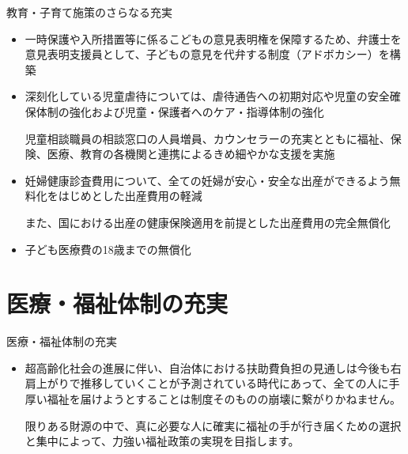 \documentclass[dvipdfmx]{beamer}
\begin{document}
    \begin{frame}{教育・子育て施策のさらなる充実}{}
        \begin{small}
            \begin{itemize}
                \setlength{\parsep}{.5mm}
                \setlength{\itemsep}{2mm}
                \item 一時保護や入所措置等に係るこどもの意見表明権を保障するため、弁護士を意見表明支援員として、子どもの意見を代弁する制度（アドボカシー）を構築
                \item 深刻化している児童虐待については、虐待通告への初期対応や児童の安全確保体制の強化および児童・保護者へのケア・指導体制の強化\par
                児童相談職員の相談窓口の人員増員、カウンセラーの充実とともに福祉、保険、医療、教育の各機関と連携によるきめ細やかな支援を実施
                \item 妊婦健康診査費用について、全ての妊婦が安心・安全な出産ができるよう無料化をはじめとした出産費用の軽減\par
                また、国における出産の健康保険適用を前提とした出産費用の完全無償化
                \item 子ども医療費の18歳までの無償化
            \end{itemize}
        \end{small}
    \end{frame}

\section{医療・福祉体制の充実}
    \begin{frame}{}{}
        \sectionpage
    \end{frame}

    \begin{frame}{医療・福祉体制の充実}{}
        \begin{small}
            \begin{itemize}
                \setlength{\parsep}{.5mm}
                \setlength{\itemsep}{2mm}
                \item 超高齢化社会の進展に伴い、自治体における扶助費負担の見通しは今後も右肩上がりで推移していくことが予測されている時代にあって、全ての人に手厚い福祉を届けようとすることは制度そのものの崩壊に繋がりかねません。\par
                限りある財源の中で、真に必要な人に確実に福祉の手が行き届くための選択と集中によって、力強い福祉政策の実現を目指します。
            \end{itemize}
        \end{small}
    \end{frame}
\end{document}

